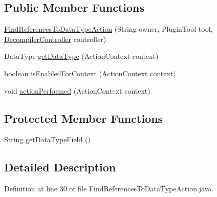 \subsection*{Public Member Functions}
\begin{DoxyCompactItemize}
\item 
\mbox{\hyperlink{classghidra_1_1app_1_1plugin_1_1core_1_1decompile_1_1actions_1_1_find_references_to_data_type_action_ac5f1bde4fadb47210d931b3683834823}{Find\+References\+To\+Data\+Type\+Action}} (String owner, Plugin\+Tool tool, \mbox{\hyperlink{classghidra_1_1app_1_1decompiler_1_1component_1_1_decompiler_controller}{Decompiler\+Controller}} controller)
\item 
Data\+Type \mbox{\hyperlink{classghidra_1_1app_1_1plugin_1_1core_1_1decompile_1_1actions_1_1_find_references_to_data_type_action_a7a6072e0b054bef56b8a5dbcef1e6f4d}{get\+Data\+Type}} (Action\+Context context)
\item 
boolean \mbox{\hyperlink{classghidra_1_1app_1_1plugin_1_1core_1_1decompile_1_1actions_1_1_find_references_to_data_type_action_a85d6965d0fd896bfb3b852a5e9ba2e86}{is\+Enabled\+For\+Context}} (Action\+Context context)
\item 
void \mbox{\hyperlink{classghidra_1_1app_1_1plugin_1_1core_1_1decompile_1_1actions_1_1_find_references_to_data_type_action_a9eee3a3fe08dc8c0eb13ff280316e2a7}{action\+Performed}} (Action\+Context context)
\end{DoxyCompactItemize}
\subsection*{Protected Member Functions}
\begin{DoxyCompactItemize}
\item 
String \mbox{\hyperlink{classghidra_1_1app_1_1plugin_1_1core_1_1decompile_1_1actions_1_1_find_references_to_data_type_action_ad65bcc7269c569b8cbfdc7c7355f6af9}{get\+Data\+Type\+Field}} ()
\end{DoxyCompactItemize}


\subsection{Detailed Description}


Definition at line 30 of file Find\+References\+To\+Data\+Type\+Action.\+java.



